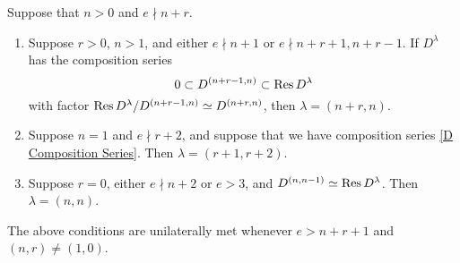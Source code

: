 \documentclass{amsart}
\begin{document}
\iffalse
\begin{proposition}
  Suppose that $n > 0$ and $e \nmid n + r$.
  \begin{enumerate}[label={(\roman*)}]
    \item Suppose $r > 0$, $n > 1$, and either $e \nmid n + 1$ or $e \nmid n + r + 1, n + r - 1$.
      If $D^\lambda$ has the composition series 
      \begin{equation}\label{D Composition Series}
        0 \subset D^{(n+r-1,n)} \subset \text{Res} \, D^{\lambda}
      \end{equation}
      with factor $\text{Res} \, D^{\lambda} / D^{(n+r-1,n)} \simeq D^{(n+r,n)}$, then $\lambda = (n+r,n)$.
    \item Suppose $n = 1$ and $e \nmid r+2$, and suppose that we have composition series \eqref{D Composition Series}.
      Then $\lambda=(r+1,r+2)$.
    \item Suppose $r = 0$, either $e \nmid n+2$ or $e > 3$, and $D^{(n,n-1)} \simeq \text{Res} \, D^\lambda$.
      Then $\lambda = (n,n)$.
  \end{enumerate}
  The above conditions are unilaterally met whenever $e > n + r + 1$ and $(n,r) \neq (1,0)$.
\end{proposition}
\end{document}
